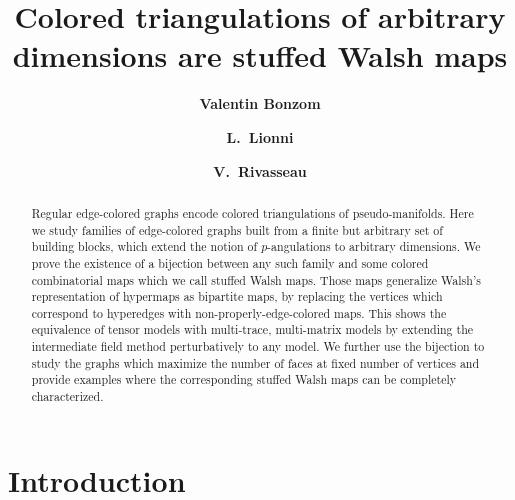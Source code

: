 \documentclass[aps,prd,10pt,notitlepage,nofootinbib,superscriptaddress,showkeys,showpacs]{revtex4-1}
\begin{document}
\title{\Large Colored triangulations of arbitrary dimensions are stuffed Walsh maps}

\author{{\bf Valentin Bonzom}}

\author{{\bf L.~Lionni}}

\author{{\bf V.~Rivasseau}}

\begin{abstract}
Regular edge-colored graphs encode colored triangulations of pseudo-manifolds. Here we study families of edge-colored graphs built from a finite but arbitrary set of building blocks, which extend the notion of $p$-angulations to arbitrary dimensions. We prove the existence of a bijection between any such family and some colored combinatorial maps which we call stuffed Walsh maps. Those maps generalize Walsh's representation of hypermaps as bipartite maps, by replacing the vertices which correspond to hyperedges with non-properly-edge-colored maps. This shows the equivalence of tensor models with multi-trace, multi-matrix models by extending the intermediate field method perturbatively to any model. We further use the bijection to study the graphs which maximize the number of faces at fixed number of vertices and provide examples where the corresponding stuffed Walsh maps can be completely characterized.
\end{abstract}


\maketitle

\section*{Introduction}
\end{document}
